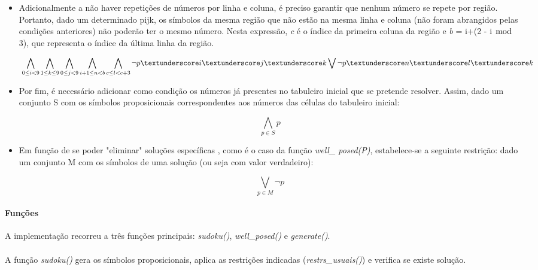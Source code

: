 \documentclass[a4paper,12pt]{article}
\begin{document}
\begin{itemize}
	
	\item Adicionalmente a não haver repetições de números por linha e coluna, é preciso garantir que nenhum número se repete por região. Portanto, dado um determinado p\textunderscore i\textunderscore j\textunderscore k, os símbolos da mesma região que não estão na mesma linha e coluna (não foram abrangidos pelas condições anteriores) não poderão ter o mesmo número. Nesta expressão, {\it c} é o índice da primeira coluna da região e {\it b} = i+(2 - i $\bmod$ 3), que representa o índice da última linha da região.
	
	\begin{displaymath}
	\
	\bigwedge_{0\leq i < 9} \bigwedge_{1\leq k \leq 9} \bigwedge_{0\leq j < 9} \bigwedge_{i + 1 \leq n < b} \bigwedge_{c\leq l < c+3} \lnot p \textunderscore i\textunderscore j\textunderscore k \bigvee \lnot p \textunderscore n \textunderscore l \textunderscore k
	\end{displaymath}
	
	\item Por fim, é necessário adicionar como condição os números já presentes no tabuleiro inicial que se pretende resolver. Assim, dado um conjunto S com os símbolos proposicionais correspondentes aos números das células do tabuleiro inicial: 
	
	\begin{displaymath}
	\
	\bigwedge_{p\in S} p
	\end{displaymath}
	
	\item Em função de se poder "eliminar" soluções específicas , como é o caso da função {\it well\_ posed(P)}, estabelece-se a seguinte restrição: dado um conjunto M com os símbolos de uma solução (ou seja com valor verdadeiro):
	
	\begin{displaymath}
	\
	\bigvee_{p\in M} \lnot p
	\end{displaymath}
	
\end{itemize}
\paragraph{Funções \newline}
A implementação recorreu a três funções principais: {\it sudoku()}, {\it well\_posed()} e {\it generate()}.

\paragraph{}
A função {\it sudoku()} gera os símbolos proposicionais, aplica as restrições indicadas ({\it restrs\_usuais()}) e verifica se existe solução.
\end{document}
